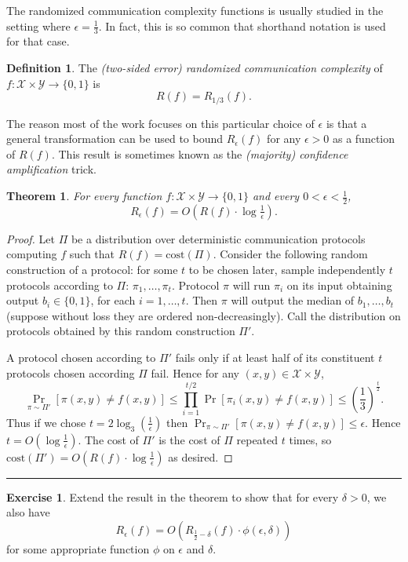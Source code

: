 \documentclass[11pt]{amsart}
\theoremstyle{plain}
\newtheorem{theorem}{Theorem}
\theoremstyle{definition}
\newtheorem{definition}{Definition}
\newtheorem{exercise}{Exercise}
\theoremstyle{plain}
\newcommand{\calX}{\mathcal{X}}
\newcommand{\calY}{\mathcal{Y}}
\newcommand{\cost}{\mathrm{cost}}
\newcommand{\exercises}{\bigskip \noindent\rule{8cm}{0.4pt} \medskip}
\begin{document}
The randomized communication complexity functions is usually studied in the setting where $\epsilon = \frac13$. In fact, this is so common that shorthand notation is used for that case.

\begin{definition}
The \emph{(two-sided error) randomized communication complexity} of $f : \calX \times \calY \to \{0,1\}$ is
\[
R(f) = R_{1/3}(f).
\]
\end{definition}

The reason most of the work focuses on this particular choice of $\epsilon$ is that a general transformation can be used to bound $R_\epsilon(f)$ for any $\epsilon > 0$ as a function of $R(f)$. This result is sometimes known as the \emph{(majority) confidence amplification} trick.

\begin{theorem}
For every function $f : \calX \times \calY \to \{0,1\}$ and every $0 < \epsilon < \frac12$, 
\[
R_\epsilon(f) = O\left( R(f) \cdot \log \tfrac1\epsilon \right).
\]
\end{theorem}

\begin{proof}
Let $\Pi$ be a distribution over deterministic communication protocols computing $f$ such that $R(f) = \cost(\Pi)$. Consider the following random construction of a protocol: for some $t$ to be chosen later, sample independently $t$ protocols according to $\Pi$: $\pi_1,\dots, \pi_t$. Protocol $\pi$ will run $\pi_i$ on its input obtaining output $b_i \in\{0,1\}$, for each $i = 1,\dots, t$. Then $\pi$ will output the median of $b_1, \dots, b_t$ (suppose without loss they are ordered non-decreasingly). Call the distribution on protocols obtained by this random construction $\Pi'$.

A protocol chosen according to $\Pi'$ fails only if at least half of its constituent $t$ protocols chosen according $\Pi$ fail. Hence for any $(x,y) \in \calX\times \calY$,
$$\Pr_{\pi \sim \Pi'}[\pi(x,y)\neq f(x,y)] \leq \prod_{i=1}^{t/2} \Pr[\pi_i(x,y) \neq f(x,y)] \leq (\frac{1}{3})^{\frac{t}{2}}.$$
Thus if we chose $t = 2\log_3(\frac{1}{\epsilon})$ then $\Pr_{\pi \sim \Pi'}[\pi(x,y)\neq f(x,y)] \leq \epsilon$. Hence $t = O(\log\frac{1}{\epsilon})$. The cost of $\Pi'$ is the cost of $\Pi$ repeated $t$ times, so $\cost(\Pi') = O(R(f)\cdot \log\frac{1}{\epsilon})$ as desired.
\end{proof}

\exercises

\begin{exercise}
Extend the result in the theorem to show that for every $\delta > 0$, we also have
\[
R_\epsilon(f) = O\left( R_{\frac12 - \delta}(f) \cdot \phi(\epsilon,\delta) \right)
\]
for some appropriate function $\phi$ on $\epsilon$ and $\delta$.
\end{exercise}
\end{document}
